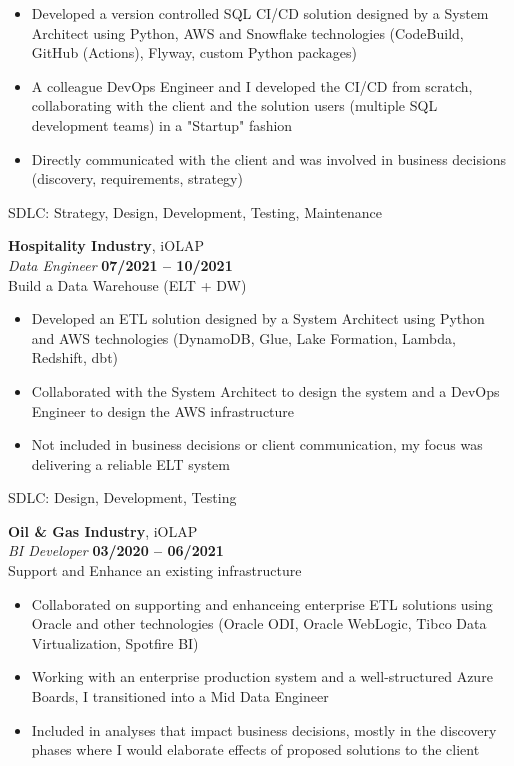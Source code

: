 \documentclass[margin,line]{resume}
\begin{document}
\begin{resume}
    \begin{itemize}
        \item Developed a version controlled SQL CI/CD solution designed by a System Architect using Python, AWS and Snowflake technologies (CodeBuild, GitHub (Actions), Flyway, custom Python packages)
		\item A colleague DevOps Engineer and I developed the CI/CD from scratch, collaborating with the client and the solution users (multiple SQL development teams) in a "Startup" fashion
		\item Directly communicated with the client and was involved in business decisions (discovery, requirements, strategy)
		
    \end{itemize}

    SDLC: Strategy, Design, Development, Testing, Maintenance

    \textbf{Hospitality Industry}, iOLAP \vspace{2mm}\\\vspace{1mm}%
    \textsl{Data Engineer} \hfill \textbf{07/2021 -- 10/2021}\\
    Build a Data Warehouse (ELT + DW)

    \begin{itemize}
        \item Developed an ETL solution designed by a System Architect using Python and AWS technologies (DynamoDB, Glue, Lake Formation, Lambda, Redshift, dbt)
		\item Collaborated with the System Architect to design the system and a DevOps Engineer to design the AWS infrastructure
		\item Not included in business decisions or client communication, my focus was delivering a reliable ELT system
		
    \end{itemize}

    SDLC: Design, Development, Testing

    \textbf{Oil \& Gas Industry}, iOLAP \vspace{2mm}\\\vspace{1mm}%
    \textsl{BI Developer} \hfill \textbf{03/2020 -- 06/2021}\\
    Support and Enhance an existing infrastructure

    \begin{itemize}
        \item Collaborated on supporting and enhanceing enterprise ETL solutions using Oracle and other technologies (Oracle ODI, Oracle WebLogic, Tibco Data Virtualization, Spotfire BI)
		\item Working with an enterprise production system and a well-structured Azure Boards, I transitioned into a Mid Data Engineer
		\item Included in analyses that impact business decisions, mostly in the discovery phases where I would elaborate effects of proposed solutions to the client
		

\end{itemize}
\end{resume}
\end{document}
